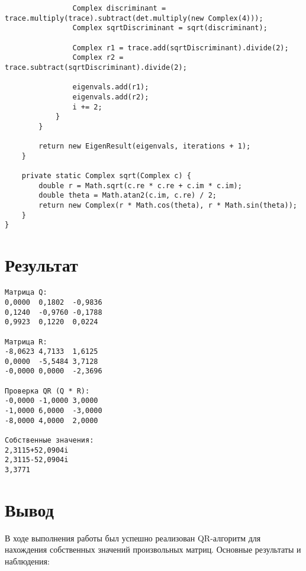 \begin{verbatim}
                Complex discriminant = trace.multiply(trace).subtract(det.multiply(new Complex(4)));
                Complex sqrtDiscriminant = sqrt(discriminant);

                Complex r1 = trace.add(sqrtDiscriminant).divide(2);
                Complex r2 = trace.subtract(sqrtDiscriminant).divide(2);

                eigenvals.add(r1);
                eigenvals.add(r2);
                i += 2;
            }
        }

        return new EigenResult(eigenvals, iterations + 1);
    }

    private static Complex sqrt(Complex c) {
        double r = Math.sqrt(c.re * c.re + c.im * c.im);
        double theta = Math.atan2(c.im, c.re) / 2;
        return new Complex(r * Math.cos(theta), r * Math.sin(theta));
    }
}
\end{verbatim}

\section*{Результат}

\begin{verbatim}
Матрица Q:
0,0000	0,1802	-0,9836	
0,1240	-0,9760	-0,1788	
0,9923	0,1220	0,0224	

Матрица R:
-8,0623	4,7133	1,6125	
0,0000	-5,5484	3,7128	
-0,0000	0,0000	-2,3696	

Проверка QR (Q * R):
-0,0000	-1,0000	3,0000	
-1,0000	6,0000	-3,0000	
-8,0000	4,0000	2,0000	

Собственные значения:
2,3115+52,0904i
2,3115-52,0904i
3,3771
\end{verbatim}

\section*{Вывод}

В ходе выполнения работы был успешно реализован QR-алгоритм для нахождения собственных значений произвольных матриц. Основные результаты и наблюдения:

